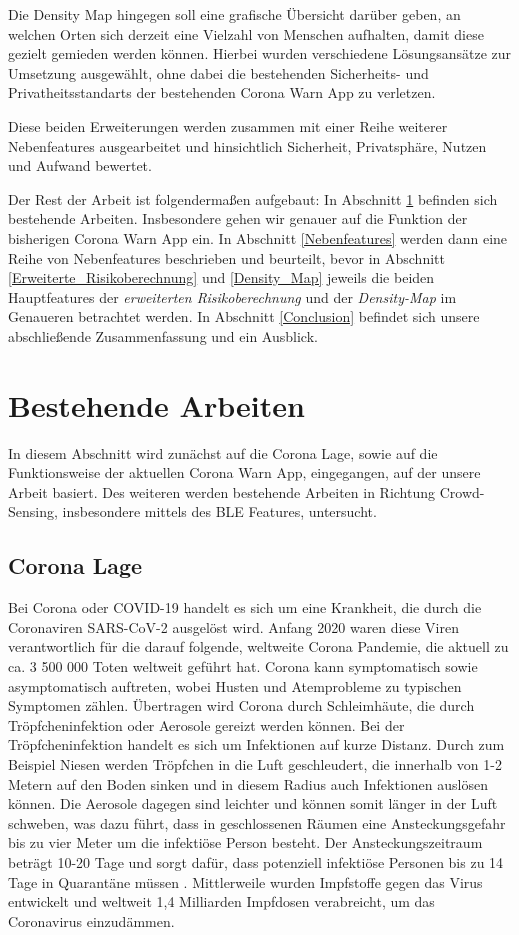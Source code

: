 \documentclass[conference,compsoc]{IEEEtran}
\begin{document}
Die Density Map hingegen soll eine grafische Übersicht darüber geben, an welchen Orten sich derzeit eine Vielzahl von Menschen aufhalten, damit diese gezielt gemieden werden können. 
Hierbei wurden verschiedene Lösungsansätze zur Umsetzung ausgewählt, ohne dabei die bestehenden Sicherheits- und Privatheitsstandarts der bestehenden Corona Warn App zu verletzen. 

Diese beiden Erweiterungen werden zusammen mit einer Reihe weiterer Nebenfeatures ausgearbeitet und hinsichtlich Sicherheit, Privatsphäre, Nutzen und Aufwand bewertet. 

Der Rest der Arbeit ist folgendermaßen aufgebaut: In Abschnitt \ref{rel_work} befinden sich bestehende Arbeiten. 
Insbesondere gehen wir genauer auf die Funktion der bisherigen Corona Warn App ein. 
In Abschnitt \ref{Nebenfeatures} werden dann eine Reihe von Nebenfeatures beschrieben und beurteilt,
bevor in Abschnitt \ref{Erweiterte_Risikoberechnung} und \ref{Density_Map} jeweils die beiden Hauptfeatures der \textit{erweiterten Risikoberechnung} und der \textit{Density-Map} im Genaueren betrachtet werden. 
In Abschnitt \ref{Conclusion} befindet sich unsere abschließende Zusammenfassung und ein Ausblick. 

\section{Bestehende Arbeiten} \label{rel_work}

In diesem Abschnitt wird zunächst auf die Corona Lage, sowie auf die Funktionsweise der aktuellen Corona Warn App, eingegangen, auf der unsere Arbeit basiert. 
Des weiteren werden  bestehende Arbeiten in Richtung Crowd-Sensing, insbesondere mittels des BLE Features, untersucht. 
\subsection{Corona Lage}
Bei Corona oder COVID-19 handelt es sich um eine Krankheit, die durch die Coronaviren SARS-CoV-2 ausgelöst wird. 
Anfang 2020 waren diese Viren verantwortlich für die darauf folgende, weltweite Corona Pandemie, die aktuell zu ca. 3 500 000 Toten \cite{CoronaZahlenWorld} weltweit geführt hat. 
Corona kann symptomatisch sowie asymptomatisch auftreten, wobei Husten und Atemprobleme zu typischen Symptomen zählen.
Übertragen wird Corona durch Schleimhäute, die durch Tröpfcheninfektion oder Aerosole gereizt werden können.
Bei der Tröpfcheninfektion handelt es sich um Infektionen auf kurze Distanz. Durch zum Beispiel Niesen werden Tröpfchen in die Luft geschleudert, die innerhalb von 1-2 Metern auf den Boden sinken und in diesem Radius auch Infektionen auslösen können. 
Die Aerosole dagegen sind leichter und können somit länger in der Luft schweben, 
was dazu führt, dass in geschlossenen Räumen eine Ansteckungsgefahr bis zu vier Meter um die infektiöse Person besteht. 
Der Ansteckungszeitraum beträgt 10-20 Tage und sorgt dafür, dass potenziell infektiöse Personen bis zu 14 Tage in Quarantäne müssen \cite{Ubertragungswege}.
Mittlerweile wurden Impfstoffe gegen das Virus entwickelt und weltweit 1,4 Milliarden Impfdosen verabreicht, um das Coronavirus einzudämmen.
\end{document}
